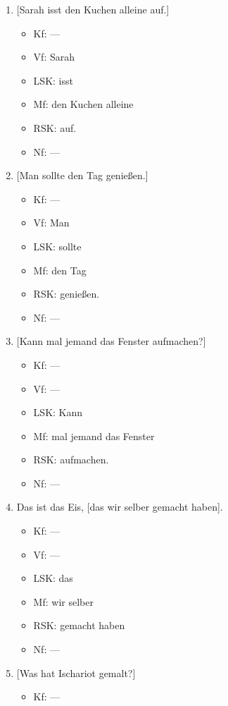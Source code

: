 \begin{enumerate}\Lf
  \item{} [Sarah isst den Kuchen alleine auf.]
    \begin{itemize}\Lf
      \item Kf: ---
      \item Vf: Sarah
      \item LSK: isst
      \item Mf: den Kuchen alleine
      \item RSK: auf.
      \item Nf: ---
    \end{itemize}
  \item{} [Man sollte den Tag genießen.]
    \begin{itemize}\Lf
      \item Kf: ---
      \item Vf: Man
      \item LSK: sollte
      \item Mf: den Tag
      \item RSK: genießen.
      \item Nf: ---
    \end{itemize}
  \item{} [Kann mal jemand das Fenster aufmachen?]
    \begin{itemize}\Lf
      \item Kf: ---
      \item Vf: ---
      \item LSK: Kann
      \item Mf: mal jemand das Fenster
      \item RSK: aufmachen.
      \item Nf: ---
    \end{itemize}
  \item Das ist das Eis, [das wir selber gemacht haben].
    \begin{itemize}\Lf
      \item Kf: ---
      \item Vf: ---
      \item LSK: das
      \item Mf: wir selber
      \item RSK: gemacht haben
      \item Nf: ---
    \end{itemize}
  \item{} [Was hat Ischariot gemalt?]
    \begin{itemize}\Lf
      \item Kf: ---

\end{itemize}
\end{enumerate}
